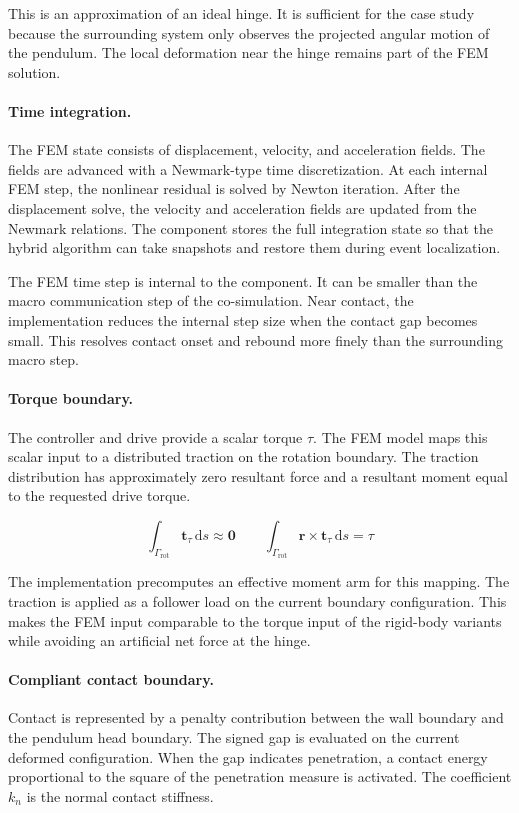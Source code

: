This is an approximation of an ideal hinge.
It is sufficient for the case study because the surrounding system only observes the projected angular motion of the pendulum.
The local deformation near the hinge remains part of the \ac{FEM} solution.

\paragraph{Time integration.}
The \ac{FEM} state consists of displacement, velocity, and acceleration fields.
The fields are advanced with a Newmark-type time discretization.
At each internal \ac{FEM} step, the nonlinear residual is solved by Newton iteration.
After the displacement solve, the velocity and acceleration fields are updated from the Newmark relations.
The component stores the full integration state so that the hybrid algorithm can take snapshots and restore them during event localization.

The \ac{FEM} time step is internal to the component.
It can be smaller than the macro communication step of the co-simulation.
Near contact, the implementation reduces the internal step size when the contact gap becomes small.
This resolves contact onset and rebound more finely than the surrounding macro step.

\paragraph{Torque boundary.}
The controller and drive provide a scalar torque \(\tau\).
The \ac{FEM} model maps this scalar input to a distributed traction on the rotation boundary.
The traction distribution has approximately zero resultant force and a resultant moment equal to the requested drive torque.

\[
  \int_{\Gamma_{\mathrm{rot}}} \mathbf{t}_{\tau} \,\mathrm{d}s \approx \mathbf{0}
  \qquad
  \int_{\Gamma_{\mathrm{rot}}} \mathbf{r} \times \mathbf{t}_{\tau} \,\mathrm{d}s = \tau
\]

The implementation precomputes an effective moment arm for this mapping.
The traction is applied as a follower load on the current boundary configuration.
This makes the \ac{FEM} input comparable to the torque input of the rigid-body variants while avoiding an artificial net force at the hinge.

\paragraph{Compliant contact boundary.}
Contact is represented by a penalty contribution between the wall boundary and the pendulum head boundary.
The signed gap is evaluated on the current deformed configuration.
When the gap indicates penetration, a contact energy proportional to the square of the penetration measure is activated.
The coefficient \(k_n\) is the normal contact stiffness.

